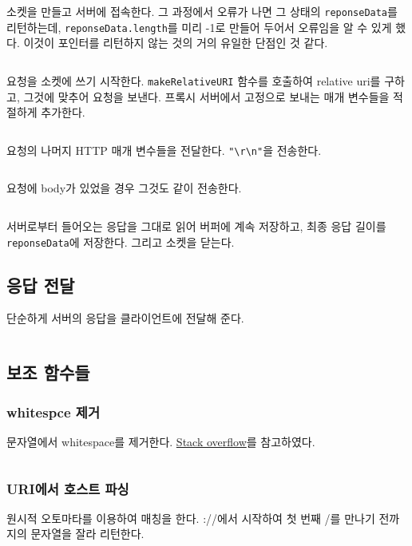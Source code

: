 \documentclass{report}
\begin{document}
\inputminted[firstline=280,lastline=289, linenos, breaklines]{C}{../submit/proxy.c}
소켓을 만들고 서버에 접속한다. 그 과정에서 오류가 나면 그 상태의 \lstinline{reponseData}를 리턴하는데, \lstinline{reponseData.length}를 미리 -1로 만들어 두어서 오류임을 알 수 있게 했다. 이것이 포인터를 리턴하지 않는 것의 거의 유일한 단점인 것 같다.

\inputminted[firstline=290,lastline=315, linenos, breaklines]{C}{../submit/proxy.c}
요청을 소켓에 쓰기 시작한다. \lstinline{makeRelativeURI} 함수를 호출하여 relative uri를 구하고, 그것에 맞추어 요청을 보낸다. 프록시 서버에서 고정으로 보내는 매개 변수들을 적절하게 추가한다.

\inputminted[firstline=316,lastline=323, linenos, breaklines]{C}{../submit/proxy.c}
요청의 나머지 HTTP 매개 변수들을 전달한다. \lstinline{"\r\n"}을 전송한다.

\inputminted[firstline=324,lastline=326, linenos, breaklines]{C}{../submit/proxy.c}
요청에 body가 있었을 경우 그것도 같이 전송한다.

\inputminted[firstline=328,lastline=344, linenos, breaklines]{C}{../submit/proxy.c}
서버로부터 들어오는 응답을 그대로 읽어 버퍼에 계속 저장하고, 최종 응답 길이를 \lstinline{reponseData}에 저장한다. 그리고 소켓을 닫는다.

\subsection{응답 전달}
단순하게 서버의 응답을 클라이언트에 전달해 준다.
\inputminted[firstline=368,lastline=373, linenos, breaklines]{C}{../submit/proxy.c}

\subsection{보조 함수들}
\subsubsection{whitespce 제거}
문자열에서 whitespace를 제거한다. \href{https://stackoverflow.com/a/122721/8614565}{Stack overflow}를 참고하였다.
\inputminted[firstline=369,lastline=374, linenos, breaklines]{C}{../submit/proxy.c}

\subsubsection{URI에서 호스트 파싱}
원시적 오토마타를 이용하여 매칭을 한다. ://에서 시작하여 첫 번째 /를 만나기 전까지의 문자열을 잘라 리턴한다.
\end{document}
